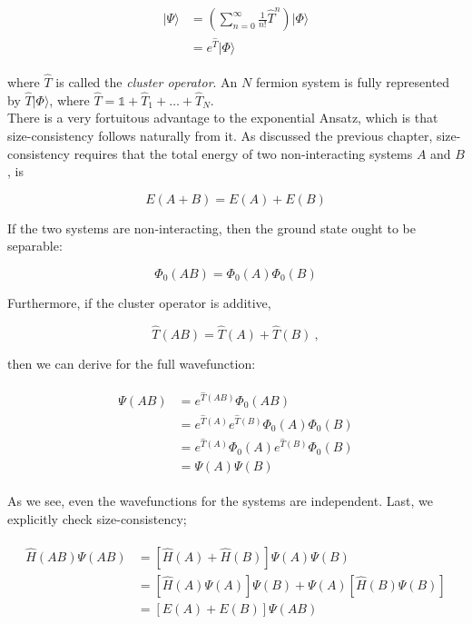 \documentclass[10pt]{report}
\begin{document}
	\begin{align}
		\begin{split}
		|\Psi\rangle &= \left(\sum_{n=0}^\infty \frac{1}{n!}\hat{T}^n\right)|\Phi\rangle\\
		&= e^{\hat{T}}|\Phi\rangle
		\end{split}
	\end{align}
	
	where $\hat{T}$ is called the \emph{cluster operator}. An $N$ fermion system is fully represented by $\hat{T}|\Phi\rangle$, where $\hat{T} = \mathds{1} + \hat{T}_1 +\ldots+\hat{T}_N$.\\
	
	There is a very fortuitous advantage to the exponential Ansatz, which is that size-consistency follows naturally from it. As discussed the previous chapter, size-consistency requires that the total energy of two non-interacting systems $A$ and $B$, is
	
	\begin{equation}
		E(A+B) = E(A) + E(B)
	\end{equation}
	
	If the two systems are non-interacting, then the ground state ought to be separable:
	
	\begin{equation}
		\Phi_0(AB) = \Phi_0(A)\Phi_0(B)
	\end{equation}
	
	Furthermore, if the cluster operator is additive,
	
	\begin{equation}
		\hat{T}(AB) = \hat{T}(A) + \hat{T}(B)\:,
	\end{equation}
	
	then we can derive for the full wavefunction:
	
	\begin{align}
		\begin{split}
			\Psi(AB) &= e^{\hat{T}(AB)}\Phi_0(AB) \\
			&= e^{\hat{T}(A)}e^{\hat{T}(B)}\Phi_0(A)\Phi_0(B) \\
			&= e^{\hat{T}(A)}\Phi_0(A)e^{\hat{T}(B)}\Phi_0(B) \\
			&= \Psi(A)\Psi(B) 
		\end{split}
	\end{align}
	
	As we see, even the wavefunctions for the systems are independent. Last, we explicitly check size-consistency;
	
	\begin{align}
		\begin{split}
			\hat{H}(AB)\Psi(AB) &= \left[ \hat{H}(A) + \hat{H}(B) \right]\Psi(A)\Psi(B) \\
			&= \left[ \hat{H}(A)\Psi(A)\right]\Psi(B) + \Psi(A)\left[\hat{H}(B)\Psi(B)\right] \\
			&= \left[E(A) + E(B)\right]\Psi(AB)
		\end{split}
	\end{align}
	
\end{document}
